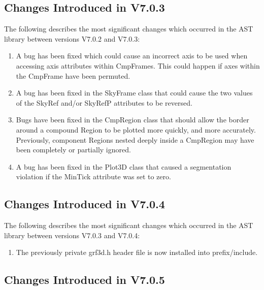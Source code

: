 \documentclass[twoside,11pt]{article}
\begin{document}
\subsection{Changes Introduced in V7.0.3}

The following describes the most significant changes which
occurred in the AST library between versions V7.0.2 and V7.0.3:

\begin{enumerate}

\item A bug has been fixed which could cause an incorrect axis to be used when
accessing axis attributes within CmpFrames. This could happen if axes
within the CmpFrame have been permuted.

\item A bug has been fixed in the SkyFrame class that could cause the two
values of the SkyRef and/or SkyRefP attributes to be reversed.

\item Bugs have been fixed in the CmpRegion class that should allow the border
around a compound Region to be plotted more quickly, and more accurately.
Previously, component Regions nested deeply inside a CmpRegion may have
been completely or partially ignored.

\item A bug has been fixed in the Plot3D class that caused a segmentation
violation if the MinTick attribute was set to zero.

\end{enumerate}

\subsection{Changes Introduced in V7.0.4}

The following describes the most significant changes which
occurred in the AST library between versions V7.0.3 and V7.0.4:


\begin{enumerate}

\item The previously private grf3d.h header file is now installed into
prefix/include.

\end{enumerate}


\subsection{Changes Introduced in V7.0.5}
\end{document}
